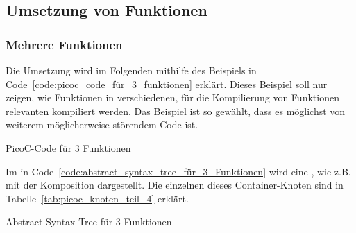 
\subsection{Umsetzung von Funktionen}
\label{sec:umsetzung_von_funktionen}

\subsubsection{Mehrere Funktionen}
\label{sec:mehrere_funktionen}

Die Umsetzung  wird im Folgenden mithilfe des Beispiels in Code~\ref{code:picoc_code_für_3_funktionen} erklärt. Dieses Beispiel soll nur zeigen, wie Funktionen in verschiedenen, für die Kompilierung von Funktionen relevanten  kompiliert werden. Das Beispiel ist so gewählt, dass es möglichst  von weiterem möglicherweise störendem Code ist.

\begin{code}
  \centering
  \caption{PicoC-Code für 3 Funktionen}
  \label{code:picoc_code_für_3_funktionen}
\end{code}

Im  in Code~\ref{code:abstract_syntax_tree_für_3_Funktionen} wird eine , wie z.B.  mit der Komposition  dargestellt. Die einzelnen  dieses Container-Knoten sind in Tabelle~\ref{tab:picoc_knoten_teil_4} erklärt.

\begin{code}
  \centering
  \caption{Abstract Syntax Tree für 3 Funktionen}
  \label{code:abstract_syntax_tree_für_3_Funktionen}
\end{code}

